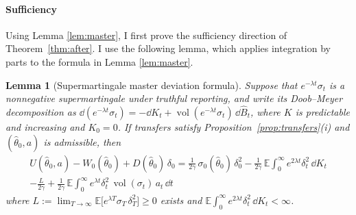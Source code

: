 \documentclass[12pt]{article}
\newtheorem{lemma}{Lemma}
\DeclareMathOperator{\vol}{vol}
\newcommand{\E}{\mathbb{E}}
\newcommand{\hth}{\hat\theta}
\newcommand{\hB}{\hat B}
\begin{document}
 \paragraph{Sufficiency}
Using Lemma \ref{lem:master}, I first prove the sufficiency direction of Theorem~\ref{thm:after}. I use the following lemma, which applies integration by parts to the formula in Lemma \ref{lem:master}.
\begin{lemma}[Supermartingale master deviation formula]\label{lem:ou-horizon}
Suppose that $e^{-\lambda t}\sigma_t$ is a nonnegative supermartingale under truthful reporting,
and write its Doob--Meyer decomposition as
\(\dd (e^{-\lambda t}\sigma_t)=-\dd K_t+\vol(e^{-\lambda t}\sigma_t)\,\dd\hB_t\), where \(K\) is predictable and
increasing and \(K_0=0\).
If transfers satisfy Proposition~\ref{prop:transfers}\textnormal{(i)} and
$(\hth_0,a)$ is admissible, then 
\begin{multline}\label{eq:ou-horizon}
U(\hth_0,a)-W_0(\hth_0)+D(\hth_0)\,\delta_0
=\frac{1}{2\gamma}\,\sigma_0(\hth_0)\,\delta_0^{2}
-\frac{1}{2\gamma}\,\E\!\int_0^\infty e^{2\lambda t}\delta_t^{2}\,\dd K_t
\\-\frac{L}{2\gamma}
+\frac{1}{2\gamma}\,\E\!\int_0^\infty e^{\lambda t}\delta_t^{2}\,
\vol(\sigma_t)\,a_t\,\dd t 
\end{multline}
where $L:=\lim_{T\to\infty}\E\big[e^{\lambda T}\sigma_T\,\delta_T^{2}\big]
\ge0$ exists and $\E\int_0^\infty e^{2\lambda t}\delta_t^{2}\,\dd K_t<\infty$.
\end{lemma}
\end{document}
